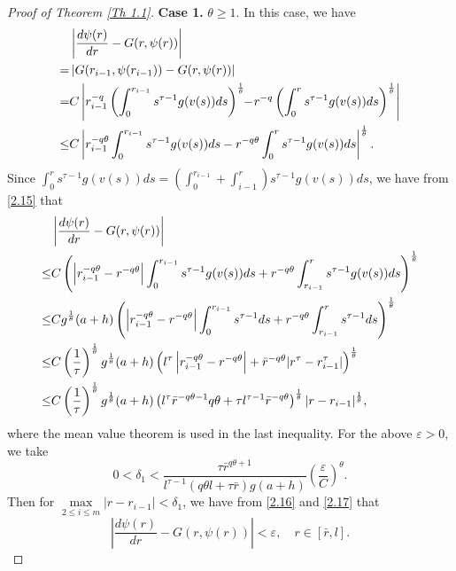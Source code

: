 \documentclass[a4paper,11pt]{amsart}
\theoremstyle{plain}
\theoremstyle{remark}
\numberwithin{equation}{section}
\numberwithin{figure}{section}
\numberwithin{remark}{section}
\begin{document}
\begin{sloppypar}
\begin{proof}[Proof of Theorem \ref{Th 1.1}]
	{\bf Case 1.} $\theta \ge 1$. In this case, we have
		\begin{align}
			&\left| \frac{d\psi(r)}{dr}-G(r,\psi(r))\right| \notag\\
			=&\left| G(r_{i-1},\psi (r_{i-1}))-G(r,\psi(r))\right| \notag\\
			=&C \left| 	r_{i-1}^{-q}\left( \int_{0}^{r_{i-1}}s^{\tau-1}g(v(s))ds\right)^\frac{1}{\theta}\!\!-\!	r^{-q}\left( \int_{0}^{r}s^{\tau-1}g(v(s))ds\right)^\frac{1}{\theta}\right| \label{2.15}\\
			\leq& C \left|  r_{i-1}^{-q\theta}\int_{0}^{r_{i-1}}s^{\tau-1}g(v(s))ds-r^{-q\theta}\int_{0}^{r}s^{\tau-1}g(v(s))ds\right|^\frac{1}{\theta}.\notag 
		\end{align}
Since $\int_{0}^{r}s^{\tau-1}g(v(s))ds = (\int_{0}^{r_{i-1}} + \int_{i-1}^{r})s^{\tau-1}g(v(s))ds$, we have from \eqref{2.15} that
		\begin{align}
			&\left| \frac{d\psi(r)}{dr}-G(r,\psi(r))\right| \notag\\
			\leq& C \left (  \left |r_{i-1}^{-q\theta}-r^{-q\theta}\right | \int_{0}^{r_{i-1}}s^{\tau-1}g(v(s))ds + r^{-q\theta}\int_{r_{i-1}}^{r}s^{\tau-1}g(v(s))ds\right )^\frac{1}{\theta} \notag \\
			 \leq& C g^{\frac{1}{\theta}}(a+h)\left (  \left |r_{i-1}^{-q\theta}-r^{-q\theta}\right | \int_{0}^{r_{i-1}}s^{\tau-1}ds + r^{-q\theta}\int_{r_{i-1}}^{r}s^{\tau-1}ds\right )^\frac{1}{\theta} \label{2.16} \\
			 \leq& C \left(\frac{1}{\tau}\right)^{\frac{1}{\theta}} g^{\frac{1}{\theta}}(a+h)\left ( l^\tau \left |r_{i-1}^{-q\theta}-r^{-q\theta}\right |  + {\bar r}^{-q\theta} |r^\tau - r_{i-1}^\tau | \right )^\frac{1}{\theta} \notag \\
			 \leq& C \left(\frac{1}{\tau}\right)^{\frac{1}{\theta}} g^{\frac{1}{\theta}}(a+h)\left ( l^\tau {\bar r}^{-q\theta -1}q\theta + \tau l^{\tau-1}{\bar r}^{-q\theta } \right )^{\frac{1}{\theta}} |r-r_{i-1}|^{\frac{1}{\theta}}, \notag 
		\end{align}
		where the mean value theorem is used in the last inequality.
	For the above $\varepsilon>0$, we take
	 \begin{equation}\label{2.17}
	 0<\delta_1 < \frac{\tau{\bar r}^{q\theta +1}}{l^{\tau-1}(q\theta l + \tau \bar r)g(a+h)}\left( \frac{\varepsilon}{C}\right)^\theta.
	 \end{equation}
	Then for $\max\limits_{2\leq i \leq m}\left|r-r_{i-1} \right| <\delta_1$, we have from \eqref{2.16} and \eqref{2.17} that
	 \begin{equation}\label{2.14'}
	 \left| \frac{d\psi(r)}{dr}-G(r,\psi(r))\right|<\varepsilon, \quad r\in [\bar r,l].
	 \end{equation}		
	 

\end{proof}
\end{sloppypar}
\end{document}

